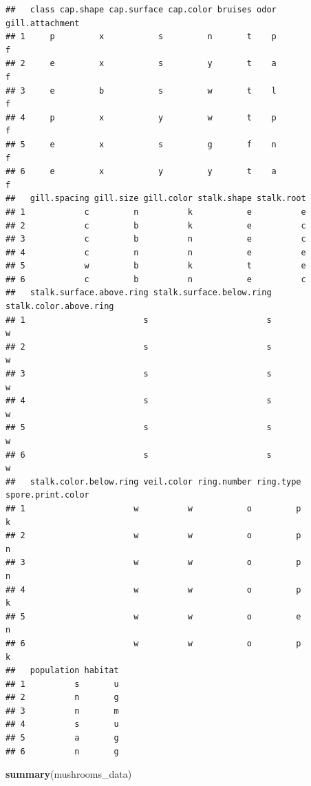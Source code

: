 \documentclass[
]{article}
\newenvironment{Shaded}{\begin{snugshade}}{\end{snugshade}}
\newcommand{\KeywordTok}[1]{\textcolor[rgb]{0.13,0.29,0.53}{\textbf{#1}}}
\newcommand{\NormalTok}[1]{#1}
\begin{document}
\begin{verbatim}
##   class cap.shape cap.surface cap.color bruises odor gill.attachment
## 1     p         x           s         n       t    p               f
## 2     e         x           s         y       t    a               f
## 3     e         b           s         w       t    l               f
## 4     p         x           y         w       t    p               f
## 5     e         x           s         g       f    n               f
## 6     e         x           y         y       t    a               f
##   gill.spacing gill.size gill.color stalk.shape stalk.root
## 1            c         n          k           e          e
## 2            c         b          k           e          c
## 3            c         b          n           e          c
## 4            c         n          n           e          e
## 5            w         b          k           t          e
## 6            c         b          n           e          c
##   stalk.surface.above.ring stalk.surface.below.ring stalk.color.above.ring
## 1                        s                        s                      w
## 2                        s                        s                      w
## 3                        s                        s                      w
## 4                        s                        s                      w
## 5                        s                        s                      w
## 6                        s                        s                      w
##   stalk.color.below.ring veil.color ring.number ring.type spore.print.color
## 1                      w          w           o         p                 k
## 2                      w          w           o         p                 n
## 3                      w          w           o         p                 n
## 4                      w          w           o         p                 k
## 5                      w          w           o         e                 n
## 6                      w          w           o         p                 k
##   population habitat
## 1          s       u
## 2          n       g
## 3          n       m
## 4          s       u
## 5          a       g
## 6          n       g
\end{verbatim}

\begin{Shaded}
\begin{Highlighting}[]
\KeywordTok{summary}\NormalTok{(mushrooms_data)}
\end{Highlighting}
\end{Shaded}
\end{document}
